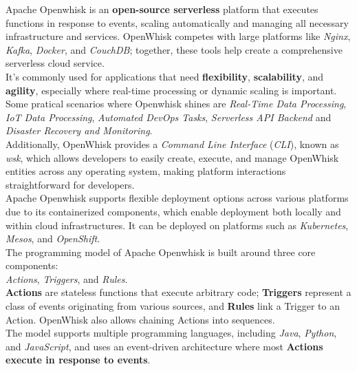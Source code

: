 Apache Openwhisk is an \textbf{open-source serverless} platform that executes functions in response to events, scaling automatically and managing all necessary infrastructure and services. OpenWhisk competes with large platforms like \textit{Nginx}, \textit{Kafka}, \textit{Docker}, and \textit{CouchDB}; together, these tools help create a comprehensive serverless cloud service.\vspace{14pt}\\
It’s commonly used for applications that need \textbf{flexibility}, \textbf{scalability}, and \textbf{agility}, especially where real-time processing or dynamic scaling is important. Some pratical scenarios where Openwhisk shines are \textit{Real-Time Data Processing}, \textit{IoT Data Processing}, \textit{Automated DevOps Tasks}, \textit{Serverless API Backend} and \textit{Disaster Recovery and Monitoring}.\vspace{14pt}\\
Additionally, OpenWhisk provides a \textit{Command Line Interface} (\textit{CLI}), known as \textit{wsk}, which allows developers to easily create, execute, and manage OpenWhisk entities across any operating system, making platform interactions straightforward for developers.\vspace{14pt}\\
Apache Openwhisk supports flexible deployment options across various platforms due to its containerized components, which enable deployment both locally and within cloud infrastructures. It can be deployed on platforms such as \textit{Kubernetes}, \textit{Mesos}, and \textit{OpenShift}.\vspace{14pt}\\
The programming model of Apache Openwhisk is built around three core components:\\
\textit{Actions}, \textit{Triggers}, and \textit{Rules}.\vspace{14pt}\\
\textbf{Actions} are stateless functions that execute arbitrary code; \textbf{Triggers} represent a class of events originating from various sources, and \textbf{Rules} link a Trigger to an Action. OpenWhisk also allows chaining Actions into sequences.\vspace{14pt}\\
The model supports multiple programming languages, including \textit{Java}, \textit{Python}, and \textit{JavaScript}, and uses an event-driven architecture where most \textbf{Actions execute in response to events}.\cite{quevedo2019evaluating}\vspace{10pt}
